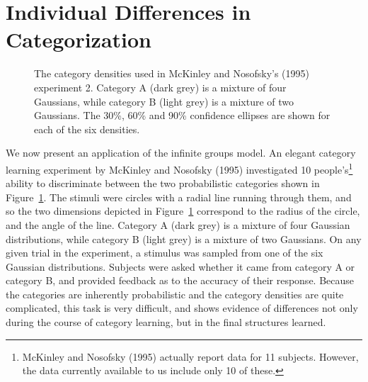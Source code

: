 \documentclass[authoryear]{elsarticle}
\newcommand{\bfc}{}
\newcommand{\efc}{\vspace*{15pt}}
\newcommand{\fcs}{}
\begin{document}
\section{Individual Differences in Categorization}

\begin{figure}[t]
\begin{center}
\caption{\bfc The category densities \fcs used in McKinley and Nosofsky's
(1995) experiment 2. Category A (dark grey) \fcs is a mixture of four
Gaussians, while category B (light grey) \fcs is a mixture of two
Gaussians. The 30\%, 60\% and 90\% confidence ellipses are shown for
each of the six densities. \efc}
\label{catpic}
\end{center}
\end{figure}

We now present an application of the infinite groups model.
An elegant category learning experiment by McKinley and Nosofsky (1995)
investigated 10 people's\footnote{McKinley and Nosofsky (1995) actually
report data for 11 subjects. However, the data currently available
to us include only 10 of these.} ability to discriminate between the two
probabilistic categories shown in Figure~\ref{catpic}. The stimuli were
circles with a radial line running through them, and so the two dimensions
depicted in Figure~\ref{catpic} correspond to the radius of the circle,
and the angle of the line. Category A (dark grey) is a mixture of four
Gaussian distributions, while category B (light grey) is a mixture of two
Gaussians. On any given trial in the experiment, a stimulus was sampled
from one of the six Gaussian distributions. Subjects were asked whether
it came from category A or category B, and provided feedback as to the
accuracy of their response. Because the categories are inherently probabilistic
and the category densities are quite complicated, this task is very difficult,
and shows evidence of differences not only during the course of category
learning, but in the final structures learned.
\end{document}
